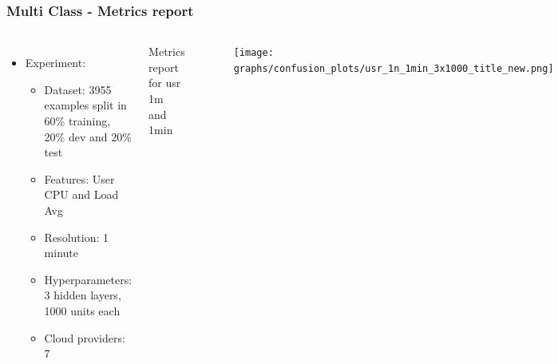 \documentclass[aspectratio=169,11pt,hyperref={colorlinks=true}]{beamer}
\begin{document}
\begin{frame}
    \frametitle{Multi Class - Metrics report}
    \begin{columns}
        \begin{itemize}
            \item{Experiment:}
            \begin{itemize}
              \item{Dataset: 3955 examples split in 60\% training, 20\% dev and 20\% test}
              \item{Features: User CPU and Load Avg}
              \item{Resolution: 1 minute}
              \item{Hyperparameters: 3 hidden layers, 1000 units each}
              \item{Cloud providers: 7}
            \end{itemize}
        \end{itemize}
        \begin{center}
         \begin{table}[h!]
           \caption{Metrics report for usr\,1m and 1min}
         \end{table}
        \end{center}
       \begin{center}
        \begin{figure}
          \texttt{[image: graphs/confusion\_plots/usr\_1n\_1min\_3x1000\_title\_new.png]}
        \end{figure}
        \end{center}
        \vfill
  \end{columns}
\end{frame}
\end{document}
